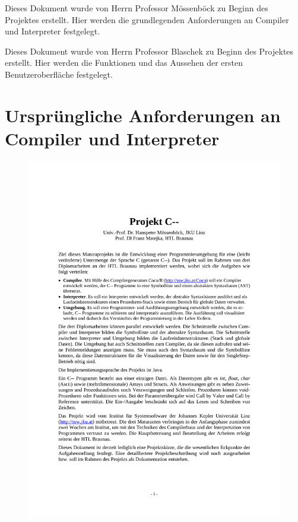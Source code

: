 \documentclass[11pt, oneside]{book}   		%
\begin{document}
Dieses Dokument wurde von Herrn Professor Mössenböck zu Beginn des Projektes erstellt. Hier werden die grundlegenden Anforderungen an Compiler und Interpreter festgelegt.

Dieses Dokument wurde von Herrn Professor Blaschek zu Beginn des Projektes erstellt. Hier werden die Funktionen und das Aussehen der ersten Benutzeroberfläche festgelegt.

\pagebreak
\section{Ursprüngliche Anforderungen an Compiler und Interpreter}
\label{app:anf-comp}

\begin{figure}[h!]
	\centering
	\includegraphics[width=1.0\textwidth]{./media/docs/Anforderung-compiler.pdf}
\end{figure}
\end{document}
